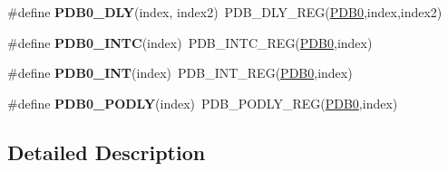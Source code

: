 \begin{DoxyCompactItemize}
\item 
\#define {\bfseries P\+D\+B0\+\_\+\+D\+LY}(index,  index2)~P\+D\+B\+\_\+\+D\+L\+Y\+\_\+\+R\+EG(\hyperlink{group__PDB__Peripheral__Access__Layer_ga91cdd5c74efea207fd5cf60bb271b90c}{P\+D\+B0},index,index2)\hypertarget{group__PDB__Register__Accessor__Macros_gad27efe5b4a447886070d14fa2fcb9e9a}{}\label{group__PDB__Register__Accessor__Macros_gad27efe5b4a447886070d14fa2fcb9e9a}

\item 
\#define {\bfseries P\+D\+B0\+\_\+\+I\+N\+TC}(index)~P\+D\+B\+\_\+\+I\+N\+T\+C\+\_\+\+R\+EG(\hyperlink{group__PDB__Peripheral__Access__Layer_ga91cdd5c74efea207fd5cf60bb271b90c}{P\+D\+B0},index)\hypertarget{group__PDB__Register__Accessor__Macros_ga9059fd037ca3b4e4b9c30f29a6fd38b7}{}\label{group__PDB__Register__Accessor__Macros_ga9059fd037ca3b4e4b9c30f29a6fd38b7}

\item 
\#define {\bfseries P\+D\+B0\+\_\+\+I\+NT}(index)~P\+D\+B\+\_\+\+I\+N\+T\+\_\+\+R\+EG(\hyperlink{group__PDB__Peripheral__Access__Layer_ga91cdd5c74efea207fd5cf60bb271b90c}{P\+D\+B0},index)\hypertarget{group__PDB__Register__Accessor__Macros_ga98787a434589fe42891c53c79c23f7bc}{}\label{group__PDB__Register__Accessor__Macros_ga98787a434589fe42891c53c79c23f7bc}

\item 
\#define {\bfseries P\+D\+B0\+\_\+\+P\+O\+D\+LY}(index)~P\+D\+B\+\_\+\+P\+O\+D\+L\+Y\+\_\+\+R\+EG(\hyperlink{group__PDB__Peripheral__Access__Layer_ga91cdd5c74efea207fd5cf60bb271b90c}{P\+D\+B0},index)\hypertarget{group__PDB__Register__Accessor__Macros_ga440f6a9da46df0e6b188b184bba566be}{}\label{group__PDB__Register__Accessor__Macros_ga440f6a9da46df0e6b188b184bba566be}

\end{DoxyCompactItemize}


\subsection{Detailed Description}
